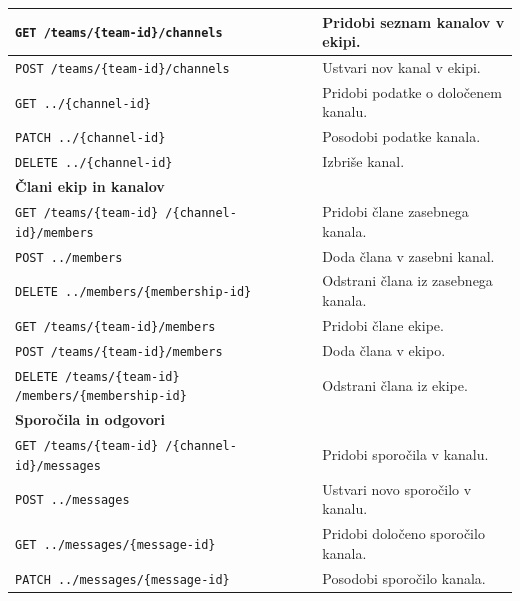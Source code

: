 \documentclass[a4paper, 12pt]{book}
\begin{document}
\begin{longtable}{|p{6cm}|p{8cm}|}
\texttt{GET /teams/\{team-id\}/channels} &
Pridobi seznam kanalov v ekipi. \\
\hline

\texttt{POST /teams/\{team-id\}/channels} &
Ustvari nov kanal v ekipi. \\
\hline

\texttt{GET ../\{channel-id\}} &
Pridobi podatke o določenem kanalu. \\
\hline

\texttt{PATCH ../\{channel-id\}} &
Posodobi podatke kanala. \\
\hline

\texttt{DELETE ../\{channel-id\}} &
Izbriše kanal. \\
\hline

\multicolumn{2}{|l|}{\textbf{Člani ekip in kanalov}} \\
\hline

\texttt{GET /teams/\{team-id\}
/\{channel-id\}/members} &
Pridobi člane zasebnega kanala. \\
\hline

\texttt{POST ../members} &
Doda člana v zasebni kanal. \\
\hline

\texttt{DELETE ../members/\{membership-id\}} &
Odstrani člana iz zasebnega kanala. \\
\hline

\texttt{GET /teams/\{team-id\}/members} &
Pridobi člane ekipe. \\
\hline

\texttt{POST /teams/\{team-id\}/members} &
Doda člana v ekipo. \\
\hline

\texttt{DELETE /teams/\{team-id\}
/members/\{membership-id\}} &
Odstrani člana iz ekipe. \\
\hline

\multicolumn{2}{|l|}{\textbf{Sporočila in odgovori}} \\
\hline

\texttt{GET /teams/\{team-id\}
/\{channel-id\}/messages} &
Pridobi sporočila v kanalu. \\
\hline

\texttt{POST ../messages} &
Ustvari novo sporočilo v kanalu. \\
\hline

\texttt{GET ../messages/\{message-id\}} &
Pridobi določeno sporočilo kanala. \\
\hline

\texttt{PATCH ../messages/\{message-id\}} &
Posodobi sporočilo kanala. \\
\hline


\end{longtable}
\end{document}
